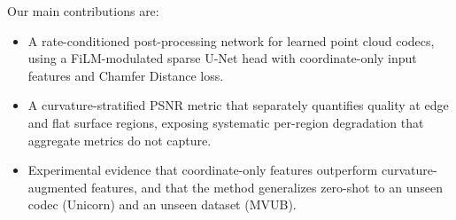 \documentclass[conference]{IEEEtran}
\begin{document}
Our main contributions are:
\begin{itemize}
  \item A rate-conditioned post-processing network for learned point cloud
    codecs, using a FiLM-modulated sparse U-Net head with coordinate-only
    input features and Chamfer Distance loss.
  \item A curvature-stratified PSNR metric that separately quantifies quality
    at edge and flat surface regions, exposing systematic per-region degradation
    that aggregate metrics do not capture.
  \item Experimental evidence that coordinate-only features outperform
    curvature-augmented features, and that the method generalizes zero-shot
    to an unseen codec (Unicorn) and an unseen dataset (MVUB).
\end{itemize}
\end{document}
